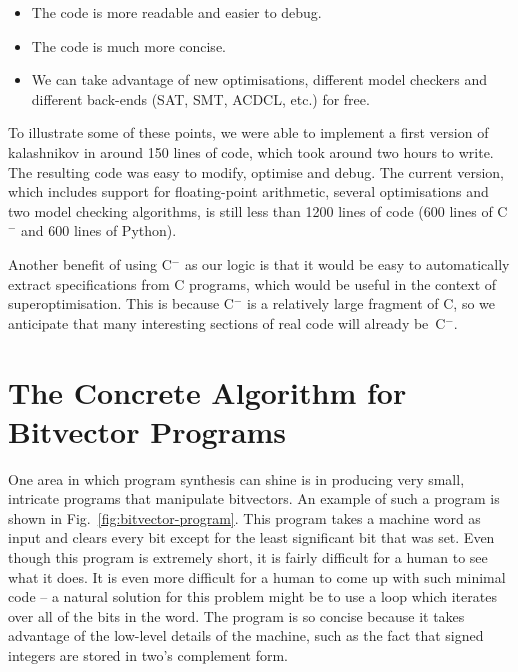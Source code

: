 \documentclass[a4paper]{llncs}
\newcommand{\newC}{C$^-$\xspace}
\begin{document}
\begin{itemize}
 \item The code is more readable and easier to debug.
 \item The code is much more concise.
 \item We can take advantage of new optimisations, different model
 checkers and different back-ends (SAT, SMT, ACDCL, etc.) for free.
\end{itemize}

To illustrate some of these points, we were able to implement a first
version of {\sc kalashnikov} in around 150 lines of code, which took around
two hours to write.  The resulting code was easy to modify, optimise and
debug.  The current version, which includes support for floating-point
arithmetic, several optimisations and two model checking algorithms, is
still less than 1200 lines of code (600 lines of \newC and 600 lines of
Python).

Another benefit of using \newC as our logic is that it would be easy to
automatically extract specifications from C programs, which would be
useful in the context of superoptimisation.  This is because \newC is
a relatively large fragment of C, so we anticipate that many interesting
sections of real code will already be~\newC.


\section{The Concrete Algorithm for Bitvector Programs}

One area in which program synthesis can shine is in producing very small,
intricate programs that manipulate bitvectors.  An example of such a program
is shown in Fig.~\ref{fig:bitvector-program}.  This program takes a machine word
as input and clears every bit except for the least significant bit that was set.
Even though this program is extremely short, it is fairly difficult for a human
to see what it does.  It is even more difficult for a human to come up with such
minimal code -- a natural solution for this problem might be to use a loop which
iterates over all of the bits in the word.  The program is so concise because it
takes advantage of the low-level details of the machine, such as the fact that
signed integers are stored in two's complement form.
\end{document}
